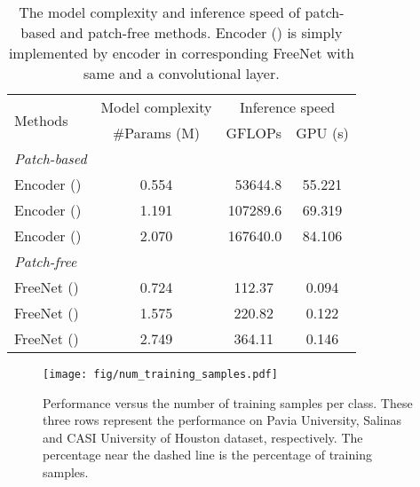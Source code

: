 \documentclass[journal]{IEEEtran}
\begin{document}
\begin{table}[hbt]
  \caption{
    The model complexity and inference speed of patch-based and patch-free methods.
    Encoder () is simply implemented by encoder in corresponding FreeNet with same  and a  convolutional layer.
    \label{tab:speed}}
  \centering
  \renewcommand{\arraystretch}{1.5}
  \begin{tabular}{l|c|cc}
    \hline
    \multirow{2}{*}{Methods}          & Model complexity      & \multicolumn{2}{c}{Inference speed}                        \\ \cline{2-4}
                                      & \#Params (M)          & GFLOPs                              & GPU (s)              \\ \hline
    \hspace{-5pt}\textit{Patch-based} & \multicolumn{1}{l|}{} & \multicolumn{1}{l}{}                & \multicolumn{1}{l}{} \\
    Encoder ()             & 0.554                 & \multicolumn{1}{r}{53644.8}         & 55.221               \\
    Encoder ()            & 1.191                 & \multicolumn{1}{r}{107289.6}        & 69.319               \\
    Encoder ()             & 2.070                 & \multicolumn{1}{r}{167640.0}        & 84.106               \\ \hline
    \hspace{-5pt}\textit{Patch-free}  &                       &                                     &                      \\
    FreeNet ()             & 0.724                 & 112.37                              & 0.094                \\
    FreeNet ()            & 1.575                 & 220.82                              & 0.122                \\
    FreeNet ()             & 2.749                 & 364.11                              & 0.146                \\ \hline
  \end{tabular}
\end{table}


\begin{figure*}[ht]
  \centering
  \texttt{[image: fig/num\_training\_samples.pdf]}
  \caption{Performance versus the number of training samples per class. 
  These three rows represent the performance on Pavia University, Salinas and CASI University of Houston dataset, respectively. 
  The percentage near the dashed line is the percentage of training samples.}
  \label{fig:num_training_samples}
\end{figure*}
\end{document}
